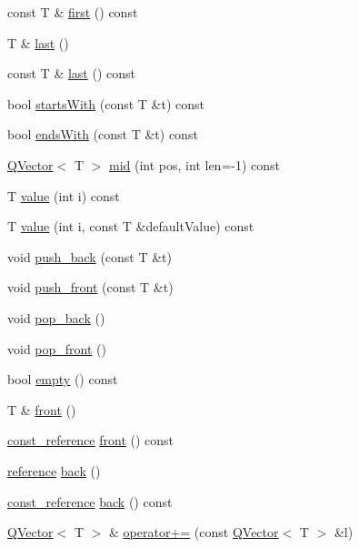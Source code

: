 \begin{DoxyCompactItemize}
const T \& \hyperlink{class_q_vector_ac9e38c34b78e0460d7f19713d5588e7d}{first} () const 
\item 
T \& \hyperlink{class_q_vector_a93f335707c6d1003dd2b594e4066ed0b}{last} ()
\item 
const T \& \hyperlink{class_q_vector_a200d93e8b761b606c07f86fe4be44cef}{last} () const 
\item 
bool \hyperlink{class_q_vector_a264d1d6641f51e6fe2bbd1fdb1e93528}{starts\+With} (const T \&t) const 
\item 
bool \hyperlink{class_q_vector_a166cfa66c83c7255127a40ad26773a99}{ends\+With} (const T \&t) const 
\item 
\hyperlink{class_q_vector}{Q\+Vector}$<$ T $>$ \hyperlink{class_q_vector_a09c185dcd5d2f02fd05dd4db84be1d28}{mid} (int pos, int len=-\/1) const 
\item 
T \hyperlink{class_q_vector_a3788cd97b1cd4898d508422cb1227f8c}{value} (int i) const 
\item 
T \hyperlink{class_q_vector_a6e81cced2857ea1d3bd3eb5eb90fe527}{value} (int i, const T \&default\+Value) const 
\item 
void \hyperlink{class_q_vector_a64a78ac295cf7c41fde971c9811116a9}{push\+\_\+back} (const T \&t)
\item 
void \hyperlink{class_q_vector_a6d51ebc0e8ff3ee57ac13170086827a5}{push\+\_\+front} (const T \&t)
\item 
void \hyperlink{class_q_vector_a4e4045d36b19dc7a6b8e3893f27f2b99}{pop\+\_\+back} ()
\item 
void \hyperlink{class_q_vector_aabe2aff9d7f1496d37d04c50e3741d0e}{pop\+\_\+front} ()
\item 
bool \hyperlink{class_q_vector_a07249d8a8b0eade3f37104ae0357d0bf}{empty} () const 
\item 
T \& \hyperlink{class_q_vector_a479198a1d185e0191e1170c200bb74aa}{front} ()
\item 
\hyperlink{class_q_vector_a4054473292677d3bc7d901db7b3b3f20}{const\+\_\+reference} \hyperlink{class_q_vector_a402094ad8fe1fe7ead5d6217466da3bc}{front} () const 
\item 
\hyperlink{class_q_vector_a86d1c26fb98028474e556d2e25b60633}{reference} \hyperlink{class_q_vector_abbea52a372bdc71b374acb422e4a4ce0}{back} ()
\item 
\hyperlink{class_q_vector_a4054473292677d3bc7d901db7b3b3f20}{const\+\_\+reference} \hyperlink{class_q_vector_a0bb36e8f88a033d56d422f6b65c29465}{back} () const 
\item 
\hyperlink{class_q_vector}{Q\+Vector}$<$ T $>$ \& \hyperlink{class_q_vector_add550c8dd5120227c645ecb069cb7196}{operator+=} (const \hyperlink{class_q_vector}{Q\+Vector}$<$ T $>$ \&l)

\end{DoxyCompactItemize}
